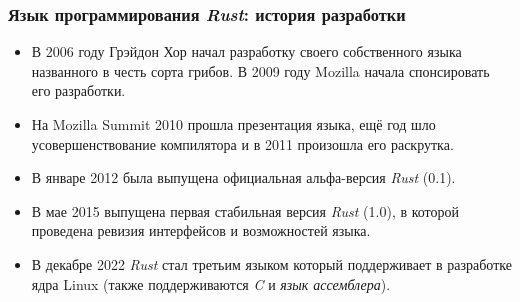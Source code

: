 \documentclass[11pt]{beamer}
\begin{document}
\begin{frame}
\frametitle{Язык программирования \textit{Rust}: история разработки}
\begin{itemize}
    \item В 2006 году Грэйдон Хор начал разработку своего собственного языка названного в честь сорта грибов. В 2009 году Mozilla начала спонсировать его разработки. 
    \item На Mozilla Summit 2010 прошла презентация языка, ещё год шло усовершенствование компилятора и в 2011 произошла его раскрутка. 
    \item В январе 2012 была выпущена официальная альфа-версия \textit{Rust} (0.1).
    \item В мае 2015 выпущена первая стабильная версия \textit{Rust} (1.0), в которой проведена ревизия интерфейсов и возможностей языка.
    \item В декабре 2022 \textit{Rust} стал третьим языком который поддерживает в разработке ядра Linux (также поддерживаются \textit{C} и \textit{язык ассемблера}).
\end{itemize}
\end{frame}
\end{document}
